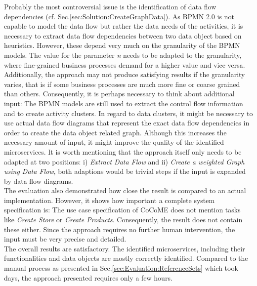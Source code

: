 Probably the most controversial issue is the identification of data flow dependencies (cf. Sec.\ref{sec:Solution:CreateGraphData}). As BPMN 2.0 is not capable to model the data flow but rather the data needs of the activities, it is necessary to extract data flow dependencies between two data object based on heuristics. However, these depend very much on the granularity of the BPMN models. The value for the parameter \textit{n} needs to be adapted to the granularity, where fine-grained business processes demand for a higher value and vice versa. Additionally, the approach may not produce satisfying results if the granularity varies, that is if some business processes are much more fine or coarse grained than others. Consequently, it is perhaps necessary to think about additional input: The BPMN models are still used to extract the control flow information and to create activity clusters. In regard to data clusters, it might be necessary to use actual data flow diagrams that represent the exact data flow dependencies in order to create the data object related graph. Although this increases the necessary amount of input, it might improve the quality of the identified microservices. It is worth mentioning that the approach itself only needs to be adapted at two positions: i) \textit{Extract Data Flow} and ii) \textit{Create a weighted Graph using Data Flow}, both  adaptions would be trivial steps if the input is expanded by data flow diagrams. \\
The evaluation also demonstrated how close the result is compared to an actual implementation. However, it shows how important a complete system specification is: The use case specification of CoCoME does not mention tasks like \textit{Create Store} or \textit{Create Products}. Consequently, the result does not contain these either. Since the approach requires no further human intervention, the input must be very precise and detailed.\\
The overall results are satisfactory. The identified microservices, including their functionalities and data objects are mostly correctly identified. Compared to the manual process as presented in Sec.\ref{sec:Evaluation:ReferenceSets} which took days, the approach presented requires only a few hours. 







